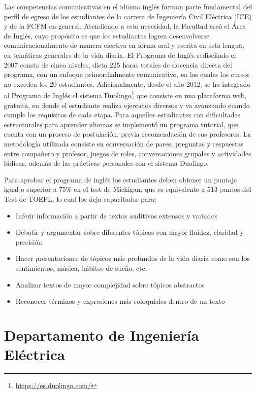 Las competencias comunicativas en el idioma inglés forman parte fundamental del perfil de egreso
de los estudiantes de la carrera de Ingeniería Civil Eléctrica (ICE) y de la FCFM en general.
Atendiendo a esta necesidad, la Facultad creó el Área de Inglés, cuyo propósito es que los
estudiantes logren desenvolverse comunicacionalmente de manera efectiva en forma oral y escrita
en esta lengua, en temáticas generales de la vida diaria. El Programa de Inglés rediseñado el
2007 consta de cinco niveles, dicta 225 horas totales de docencia directa del programa, con un
enfoque primordialmente comunicativo, en los cuales los cursos no exceden los 20 estudiantes.
Adicionalmente, desde el año 2012, se ha integrado al Programa de Inglés el sistema Duolingo\footnote{\url{https://es.duolingo.com/}}
que consiste en una plataforma web, gratuita, en donde el estudiante realiza ejercicios diversos
y va avanzando cuando cumple los requisitos de cada etapa. Para aquellos estudiantes con
dificultades estructurales para aprender idiomas se implementó un programa tutorial, que cuenta
con un proceso de postulación, previa recomendación de sus profesores. La metodología utilizada
consiste en conversación de pares, preguntas y respuestas entre compañero y profesor, juegos de
roles, conversaciones grupales y actividades lúdicas, además de las prácticas personales con el
sistema Duolingo.

Para aprobar el programa de inglés los estudiantes deben obtener un puntaje igual o superior
a 75\% en el test de Michigan, que es equivalente a 513 puntos del Test de TOEFL, lo cual los deja
capacitados para:

\begin{itemize}
\item Inferir información a partir de textos auditivos extensos y variados
\item Debatir y argumentar sobre diferentes tópicos con mayor fluidez, claridad y precisión
\item Hacer presentaciones de tópicos más profundos de la vida diaria como son los sentimientos,
música, hábitos de sueño, etc.
\item Analizar textos de mayor complejidad sobre tópicos abstractos
\item Reconocer términos y expresiones más coloquiales dentro de un texto
\end{itemize}

\section{Departamento de Ingeniería Eléctrica}


